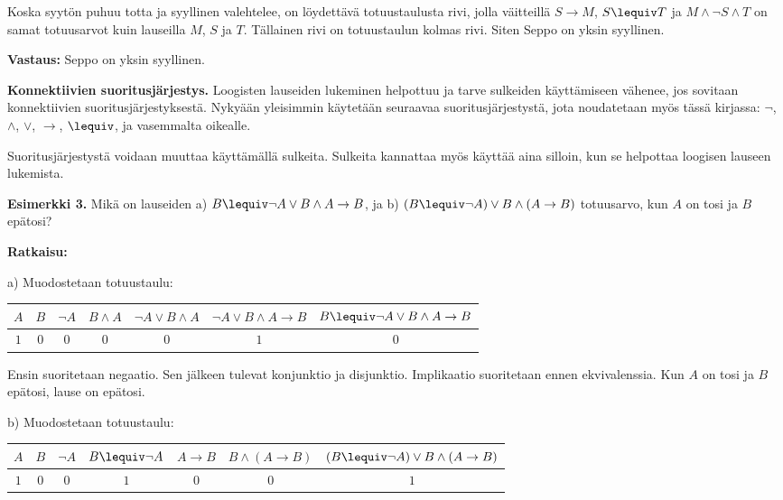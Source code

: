 \bigskip

Koska syytön puhuu totta ja syyllinen valehtelee, on löydettävä totuustaulusta rivi, jolla väitteillä $S\to M$, $S\lequiv T$ ja $M \land \lnot S\land T$ on samat totuusarvot kuin lauseilla $M$, $S$ ja $T$. Tällainen rivi on totuustaulun kolmas rivi. Siten Seppo on yksin syyllinen.

{\bf Vastaus:} Seppo on yksin syyllinen.

\bigskip

{\bf Konnektiivien suoritusjärjestys.} 
Loogisten lauseiden lukeminen helpottuu ja tarve sulkeiden käyttämiseen vähenee, jos sovitaan konnektiivien suoritusjärjestyksestä. Nykyään yleisimmin käytetään seuraavaa suoritusjärjestystä, jota noudatetaan myös tässä kirjassa: $\lnot$, $\land$, $\lor$, $\to$, $\lequiv$, ja vasemmalta oikealle.

Suoritusjärjestystä voidaan muuttaa käyttämällä sulkeita. Sulkeita kannattaa myös käyttää aina silloin, kun se helpottaa loogisen lauseen lukemista.

{\bf Esimerkki 3.}
Mikä on lauseiden a) $B \lequiv \lnot A\lor B \land A \to B$, ja  b)  $(B\lequiv \lnot A)\lor B \land (A\to B)$  totuusarvo, kun $A$ on tosi ja $B$ epätosi?   

{\bf Ratkaisu:}


a) Muodostetaan totuustaulu:

\begin{center}
\begin{tabular}{|c|c|c|c|c|c|c|}\hline
$A$ & $B$ & $\lnot A$ & $B \land A $ & $\lnot A\lor B \land A$ & $\lnot A\lor B \land A \to B$ & $B \lequiv \lnot A\lor B \land A \to B$\\ \hline
$1$ & $0$ & $0$ & $0$ & $0$ & $1$ & $0$\\ \hline
\end{tabular}
\end{center}

Ensin suoritetaan negaatio. Sen jälkeen tulevat konjunktio ja disjunktio. Implikaatio 	suoritetaan ennen ekvivalenssia. 	Kun $A$ on tosi ja $B$ epätosi, lause on epätosi.


b) Muodostetaan totuustaulu:

\begin{center}
\begin{tabular}{|c|c|c|c|c|c|c|}\hline
$A$ & $B$ & $\lnot A$ & $B\lequiv \lnot A$ & $A\to B$ & $B \land (A\to B)$ &  $(B\lequiv \lnot A)\lor B \land (A\to B)$\\ \hline
$1$ & $0$ & $0$ & $1$ & $0$ & $0$ & $1$\\ \hline
\end{tabular}
\end{center}

